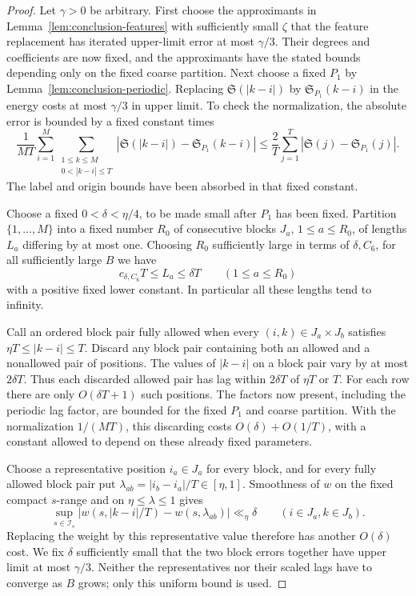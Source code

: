 \begin{proof}
Let $\gamma>0$ be arbitrary.  First choose the approximants in
Lemma~\ref{lem:conclusion-features} with sufficiently small $\zeta$
that the feature replacement has iterated upper-limit error at most
$\gamma/3$.  Their degrees and coefficients are now fixed, and the
approximants have the stated bounds depending only on the fixed coarse
partition.  Next choose a fixed $P_1$ by
Lemma~\ref{lem:conclusion-periodic}.  Replacing
$\mathfrak S(|k-i|)$ by $\mathfrak S_{P_1}(k-i)$ in the energy costs
at most $\gamma/3$ in upper limit.  To check the normalization, the
absolute error is bounded by a fixed constant times
\[
 \frac1{MT}\sum_{i=1}^M
   \sum_{\substack{1\le k\le M\\0<|k-i|\le T}}
      |\mathfrak S(|k-i|)-\mathfrak S_{P_1}(k-i)|
 \le\frac2T\sum_{j=1}^T
      |\mathfrak S(j)-\mathfrak S_{P_1}(j)|.
\]
The label and origin bounds have been absorbed in that fixed constant.

Choose a fixed $0<\delta<\eta/4$, to be made small after $P_1$ has
been fixed.  Partition $\{1,\ldots,M\}$ into a fixed number $R_0$ of
consecutive blocks $J_a$, $1\le a\le R_0$, of lengths $L_a$ differing
by at most one.  Choosing $R_0$ sufficiently large in terms of
$\delta,C_6$, for all sufficiently large $B$ we have
\[
 c_{\delta,C_6}T\le L_a\le\delta T
 \qquad(1\le a\le R_0)
\]
with a positive fixed lower constant.  In particular all these lengths
tend to infinity.

Call an ordered block pair fully allowed when every $(i,k)\in J_a\times
J_b$ satisfies $\eta T\le|k-i|\le T$.  Discard any block pair
containing both an allowed and a nonallowed pair of positions.  The
values of $|k-i|$ on a block pair vary by at most $2\delta T$.  Thus
each discarded allowed pair has lag within $2\delta T$ of $\eta T$
or $T$.  For each row there are only $O(\delta T+1)$ such positions.
The factors now present, including the periodic lag factor, are bounded
for the fixed $P_1$ and coarse partition.  With the normalization
$1/(MT)$, this discarding costs $O(\delta)+O(1/T)$, with a constant
allowed to depend on these already fixed parameters.

Choose a representative position $i_a\in J_a$ for every block, and
for every fully allowed block pair put
$\lambda_{ab}=|i_b-i_a|/T\in[\eta,1]$.  Smoothness of $w$ on the
fixed compact $s$-range and on $\eta\le\lambda\le1$ gives
\[
 \sup_{s\in\mathcal I_s}
  |w(s,|k-i|/T)-w(s,\lambda_{ab})|\ll_\eta\delta
   \qquad(i\in J_a, k\in J_b).
\]
Replacing the weight by this representative value therefore has
another $O(\delta)$ cost.  We fix $\delta$ sufficiently small that
the two block errors together have upper limit at most $\gamma/3$.
Neither the representatives nor their scaled lags have to converge as
$B$ grows; only this uniform bound is used.


\end{proof}
